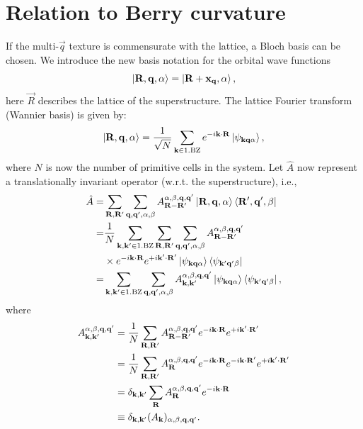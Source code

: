 \documentclass[
    10pt,
    aps,
    prb,
    twocolumn,
    floatfix,
    superscriptaddress,
]{revtex4-2}
\begin{document}
\section{Relation to Berry curvature}
\label{app:berry_curvature}

If the multi-$\vec{q}$ texture is commensurate with the lattice, a Bloch basis can be chosen.
We introduce the new basis notation for the orbital wave functions
\begin{equation}
	\ket{\vec{R}, \vec{q}, \alpha} = \ket{\vec{R}+\vec{x}_{\vec{q}}, \alpha} ,
\end{equation}
here $\vec{R}$ describes the lattice of the superstructure.
The lattice Fourier transform (Wannier basis) is given by:
\begin{equation}
	\ket{\vec{R}, \vec{q}, \alpha} = \frac{1}{\sqrt{N}}
	\sum_{\vec{k} \in \mathrm{1. BZ}} e^{-i \vec{k}\cdot\vec{R}} 
	\ket{\psi_{\vec{k} \vec{q} \alpha}},
\end{equation}
where $N$ is now the number of primitive cells in the system.
Let $\hat{A}$ now represent a translationally invariant operator (w.r.t. the superstructure), i.e.,
\begin{align}
	\hat{A}  = &\sum_{\vec{R}, \vec{R}'} \sum_{\vec{q}, \vec{q}' , \alpha, \beta}
	A_{\vec{R}-\vec{R}'}^{ \alpha, \beta, \vec{q}, \vec{q}'} \ket{\vec{R}, \vec{q}, \alpha} \bra{\vec{R}',\vec{q}', \beta}
	\notag \\
	=& \frac{1}{N} \sum_{\vec{k}, \vec{k}' \in \mathrm{1. BZ}}
	\sum_{\vec{R}, \vec{R}'} \sum_{\vec{q}, \vec{q}' , \alpha, \beta}
	A_{\vec{R}-\vec{R}'}^{ \alpha, \beta, \vec{q}, \vec{q}'} 
    \notag \\ & \times
	e^{-i \vec{k}\cdot\vec{R}} 
	e^{+i \vec{k}'\cdot\vec{R}'} 
	\ket{\psi_{\vec{k} \vec{q} \alpha}} \bra{\psi_{\vec{k}' \vec{q}' \beta}}
	\notag \\
	= & \sum_{\vec{k}, \vec{k}' \in \mathrm{1. BZ}}
	 \sum_{\vec{q}, \vec{q}' , \alpha, \beta}
	A_{\vec{k}, \vec{k}'}^{ \alpha, \beta, \vec{q}, \vec{q}'} 
	\ket{\psi_{\vec{k} \vec{q} \alpha}} \bra{\psi_{\vec{k}' \vec{q}' \beta}},
\end{align}
where 
\begin{align}
	A_{\vec{k}, \vec{k}'}^{ \alpha, \beta, \vec{q}, \vec{q}'} 
	& =  \frac{1}{N}
	\sum_{\vec{R}, \vec{R}'}A_{\vec{R}-\vec{R}'}^{ \alpha, \beta, \vec{q}, \vec{q}'} 
	e^{-i \vec{k}\cdot\vec{R}} 
	e^{+i \vec{k}'\cdot\vec{R}'} 
	\notag \\
	& =  \frac{1}{N}
	\sum_{\vec{R}, \vec{R}'}A_{\vec{R}}^{ \alpha, \beta, \vec{q}, \vec{q}'} 
	e^{-i \vec{k}\cdot\vec{R}} 
	e^{-i \vec{k}\cdot\vec{R}'} 
	e^{+i \vec{k}'\cdot\vec{R}'} 
	\notag \\
	& =   \delta_{\vec{k}, \vec{k}'}
	\sum_{\vec{R}}A_{\vec{R}}^{ \alpha, \beta, \vec{q}, \vec{q}'} 
	e^{-i \vec{k}\cdot\vec{R}} 
	\notag \\
	& \equiv   \delta_{\vec{k}, \vec{k}'}
	(A_{\vec{k}})_{ \alpha, \beta, \vec{q}, \vec{q}'} .
\end{align}
\end{document}
